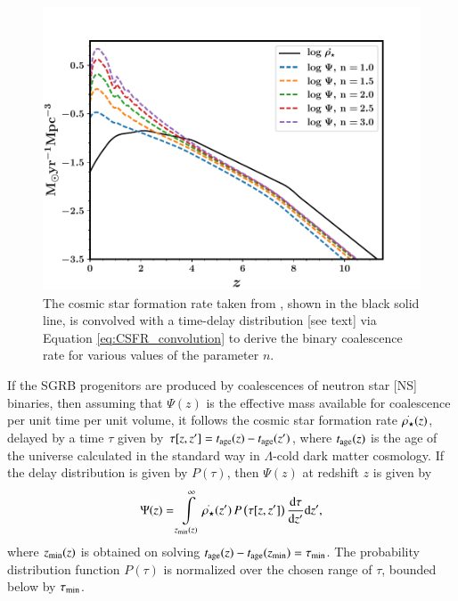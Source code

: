 \begin{figure}
\begin{center}
\includegraphics[scale=0.5]{CSFR_delay}
\caption[The binary coalescence rate]{The cosmic star formation rate taken from , shown in the black solid line, is convolved with a time-delay distribution [see text] via Equation \ref{eq:CSFR_convolution} to derive the binary coalescence rate for various values of the parameter $n$.}
\label{fig:CSFR--short}
\end{center}
\end{figure}


If the SGRB progenitors are produced by coalescences of neutron star [NS] binaries, then assuming that $\Psi(z)$ is the effective mass available for coalescence per unit time per unit volume, it follows the cosmic star formation rate $\overset{.}{\rho_{\star}}(z)$, delayed by a time $\tau$ given by $\tau[z,z'] = t_{\rm{age}}(z) - t_{\rm{age}}(z')$, where $t_{\rm{age}}(z)$ is the age of the universe calculated in the standard way in $\Lambda$-cold dark matter cosmology. If the delay distribution is given by $P(\tau)$, then $\Psi(z)$ at redshift $z$ is given by 
\begin{equation}
\Psi(z) = \intop_{z_{\rm{min}}(z)}^{\infty} \csfr(z') \, P\left( \tau[z,z'] \right) \frac{\dd \tau}{\dd z'} \dd z',
\label{eq:CSFR_convolution}
\end{equation} where $z_{\rm{min}}(z)$ is obtained on solving $t_{\rm{age}}(z) - t_{\rm{age}}(z_{\rm{min}}) = \tau_{\rm{min}}$. The probability distribution function $P(\tau)$ is normalized over the chosen range of $\tau$, bounded below by $\tau_{\rm{min}}$.


